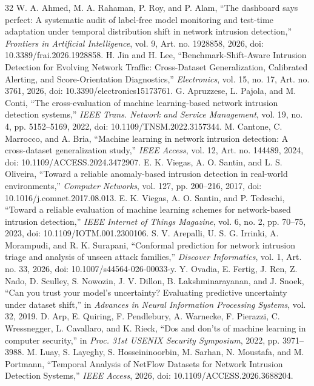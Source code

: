 \documentclass[conference]{IEEEtran}
\begin{document}
\begin{thebibliography}{32}
W. A. Ahmed, M. A. Rahaman, P. Roy, and P. Alam, ``The dashboard says perfect: A systematic audit of label-free model monitoring and test-time adaptation under temporal distribution shift in network intrusion detection,'' \emph{Frontiers in Artificial Intelligence}, vol. 9, Art. no. 1928858, 2026, doi: 10.3389/frai.2026.1928858.
H. Jin and H. Lee, ``Benchmark-Shift-Aware Intrusion Detection for Evolving Network Traffic: Cross-Dataset Generalization, Calibrated Alerting, and Score-Orientation Diagnostics,'' \emph{Electronics}, vol. 15, no. 17, Art. no. 3761, 2026, doi: 10.3390/electronics15173761.
G. Apruzzese, L. Pajola, and M. Conti, ``The cross-evaluation of machine learning-based network intrusion detection systems,'' \emph{IEEE Trans. Network and Service Management}, vol. 19, no. 4, pp. 5152--5169, 2022, doi: 10.1109/TNSM.2022.3157344.
M. Cantone, C. Marrocco, and A. Bria, ``Machine learning in network intrusion detection: A cross-dataset generalization study,'' \emph{IEEE Access}, vol. 12, Art. no. 144489, 2024, doi: 10.1109/ACCESS.2024.3472907.
E. K. Viegas, A. O. Santin, and L. S. Oliveira, ``Toward a reliable anomaly-based intrusion detection in real-world environments,'' \emph{Computer Networks}, vol. 127, pp. 200--216, 2017, doi: 10.1016/j.comnet.2017.08.013.
E. K. Viegas, A. O. Santin, and P. Tedeschi, ``Toward a reliable evaluation of machine learning schemes for network-based intrusion detection,'' \emph{IEEE Internet of Things Magazine}, vol. 6, no. 2, pp. 70--75, 2023, doi: 10.1109/IOTM.001.2300106.
S. V. Arepalli, U. S. G. Irrinki, A. Morampudi, and R. K. Surapani, ``Conformal prediction for network intrusion triage and analysis of unseen attack families,'' \emph{Discover Informatics}, vol. 1, Art. no. 33, 2026, doi: 10.1007/s44564-026-00033-y.
Y. Ovadia, E. Fertig, J. Ren, Z. Nado, D. Sculley, S. Nowozin, J. V. Dillon, B. Lakshminarayanan, and J. Snoek, ``Can you trust your model's uncertainty? Evaluating predictive uncertainty under dataset shift,'' in \emph{Advances in Neural Information Processing Systems}, vol. 32, 2019.
D. Arp, E. Quiring, F. Pendlebury, A. Warnecke, F. Pierazzi, C. Wressnegger, L. Cavallaro, and K. Rieck, ``Dos and don'ts of machine learning in computer security,'' in \emph{Proc. 31st USENIX Security Symposium}, 2022, pp. 3971--3988.
M. Luay, S. Layeghy, S. Hosseininoorbin, M. Sarhan, N. Moustafa, and M. Portmann, ``Temporal Analysis of NetFlow Datasets for Network Intrusion Detection Systems,'' \emph{IEEE Access}, 2026, doi: 10.1109/ACCESS.2026.3688204.

\end{thebibliography}
\end{document}
